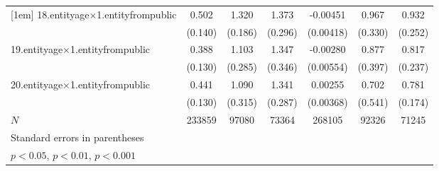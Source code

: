 {\begin{tabular}{l*{6}{c}}
[1em]
18.entityage$\times$1.entityfrompublic&       0.502\sym{**} &       1.320\sym{***}&       1.373\sym{***}&    -0.00451         &       0.967\sym{**} &       0.932\sym{***}\\
            &     (0.140)         &     (0.186)         &     (0.296)         &   (0.00418)         &     (0.330)         &     (0.252)         \\
[1em]
19.entityage$\times$1.entityfrompublic&       0.388\sym{**} &       1.103\sym{***}&       1.347\sym{***}&    -0.00280         &       0.877\sym{*}  &       0.817\sym{**} \\
            &     (0.130)         &     (0.285)         &     (0.346)         &   (0.00554)         &     (0.397)         &     (0.237)         \\
[1em]
20.entityage$\times$1.entityfrompublic&       0.441\sym{**} &       1.090\sym{**} &       1.341\sym{***}&     0.00255         &       0.702         &       0.781\sym{***}\\
            &     (0.130)         &     (0.315)         &     (0.287)         &   (0.00368)         &     (0.541)         &     (0.174)         \\
\hline
\(N\)       &      233859         &       97080         &       73364         &      268105         &       92326         &       71245         \\
\hline\hline
\multicolumn{7}{l}{\footnotesize Standard errors in parentheses}\\
\multicolumn{7}{l}{\footnotesize \sym{*} \(p<0.05\), \sym{**} \(p<0.01\), \sym{***} \(p<0.001\)}\\
\end{tabular}
}
